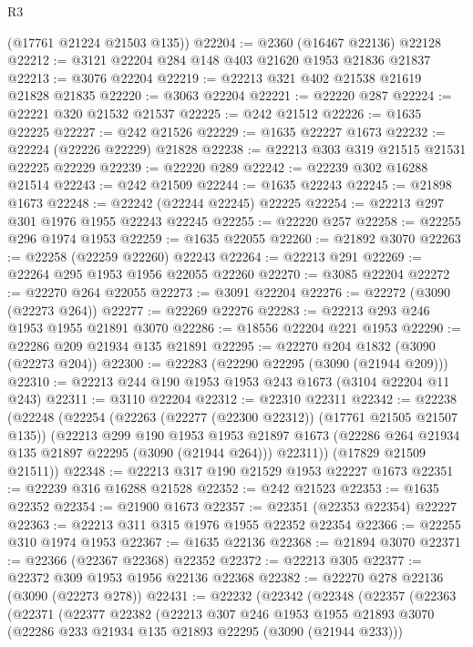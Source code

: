 \begin{lexlean}{R3}
\begin{coremodule}
      (@17761 @21224 @21503 @135))
@22204 := @2360 (@16467 @22136) @22128
@22212 := @3121 @22204 @284 @148 @403 @21620 @1953 @21836 @21837
@22213 := @3076 @22204
@22219 := @22213 @321 @402 @21538 @21619 @21828 @21835
@22220 := @3063 @22204
@22221 := @22220 @287
@22224 := @22221 @320 @21532 @21537
@22225 := @242 @21512
@22226 := @1635 @22225
@22227 := @242 @21526
@22229 := @1635 @22227 @1673
@22232 := @22224 (@22226 @22229) @21828
@22238 := @22213 @303 @319 @21515 @21531 @22225 @22229
@22239 := @22220 @289
@22242 := @22239 @302 @16288 @21514
@22243 := @242 @21509
@22244 := @1635 @22243
@22245 := @21898 @1673
@22248 := @22242 (@22244 @22245) @22225
@22254 := @22213 @297 @301 @1976 @1955 @22243 @22245
@22255 := @22220 @257
@22258 := @22255 @296 @1974 @1953
@22259 := @1635 @22055
@22260 := @21892 @3070
@22263 := @22258 (@22259 @22260) @22243
@22264 := @22213 @291
@22269 := @22264 @295 @1953 @1956 @22055 @22260
@22270 := @3085 @22204
@22272 := @22270 @264 @22055
@22273 := @3091 @22204
@22276 := @22272 (@3090 (@22273 @264))
@22277 := @22269 @22276
@22283 := @22213 @293 @246 @1953 @1955 @21891 @3070
@22286 := @18556 @22204 @221 @1953
@22290 := @22286 @209 @21934 @135 @21891
@22295 := @22270 @204 @1832 (@3090 (@22273 @204))
@22300 := @22283 (@22290 @22295 (@3090 (@21944 @209)))
@22310 := @22213 @244 @190 @1953 @1953 @243 @1673 (@3104 @22204 @11 @243)
@22311 := @3110 @22204
@22312 := @22310 @22311
@22342 := @22238
    (@22248
      (@22254
        (@22263 (@22277 (@22300 @22312)) (@17761 @21505 @21507 @135))
        (@22213
          @299
          @190
          @1953
          @1953
          @21897
          @1673
          (@22286 @264 @21934 @135 @21897 @22295 (@3090 (@21944 @264)))
          @22311))
      (@17829 @21509 @21511))
@22348 := @22213 @317 @190 @21529 @1953 @22227 @1673
@22351 := @22239 @316 @16288 @21528
@22352 := @242 @21523
@22353 := @1635 @22352
@22354 := @21900 @1673
@22357 := @22351 (@22353 @22354) @22227
@22363 := @22213 @311 @315 @1976 @1955 @22352 @22354
@22366 := @22255 @310 @1974 @1953
@22367 := @1635 @22136
@22368 := @21894 @3070
@22371 := @22366 (@22367 @22368) @22352
@22372 := @22213 @305
@22377 := @22372 @309 @1953 @1956 @22136 @22368
@22382 := @22270 @278 @22136 (@3090 (@22273 @278))
@22431 := @22232
    (@22342
      (@22348
        (@22357
          (@22363
            (@22371
              (@22377
                @22382
                (@22213
                  @307
                  @246
                  @1953
                  @1955
                  @21893
                  @3070
                  (@22286 @233 @21934 @135 @21893 @22295 (@3090 (@21944 @233)))

\end{coremodule}
\end{lexlean}

